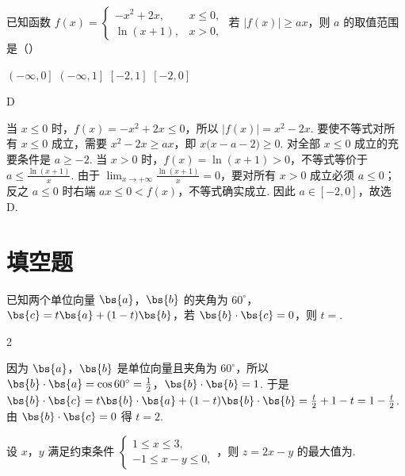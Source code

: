 \begin{problem}
已知函数 \(f(x) = \begin{cases}
-x^2 + 2x, & x \leqslant 0,\\
\ln (x + 1), & x > 0,
\end{cases} \) 若 \(|f(x)| \geqslant ax\)，则 \( a \) 的取值范围是（\quad）

\choices
    {\(\left(-\infty,0\right]\)}
    {\(\left(-\infty,1\right]\)}
    {\(\left[-2,1\right]\)}
    {\(\left[-2,0\right]\)}
\end{problem}

\begin{answer}
D
\end{answer}

\begin{solution}
当 \(x\leqslant0\) 时，\(f(x)=-x^2+2x\leqslant0\)，所以 \(|f(x)|=x^2-2x\). 要使不等式对所有 \(x\leqslant0\) 成立，需要
\(x^2-2x\geqslant ax\)，即 \(x\bigl(x-a-2\bigr)\geqslant0\). 对全部 \(x\leqslant0\) 成立的充要条件是 \(a\geqslant-2\). 当 \(x>0\) 时，\(f(x)=\ln(x+1)>0\)，不等式等价于 \(\displaystyle a\leqslant\frac{\ln(x+1)}{x}\). 由于 \(\displaystyle\lim_{x\to+\infty}\frac{\ln(x+1)}{x}=0\)，要对所有 \(x>0\) 成立必须 \(a\leqslant0\)；反之 \(a\leqslant0\) 时右端 \(ax\leqslant0<f(x)\)，不等式确实成立. 因此 \(a\in[-2,0]\)，故选 D.
\end{solution}

\section{填空题}

\begin{problem}
已知两个单位向量 \(\bs{a}\)，\(\bs{b}\) 的夹角为 \(60^{\circ}\)，\(\bs{c} = t\bs{a} + (1 - t)\bs{b}\)，若 \(\bs{b} \cdot \bs{c} = 0\)，则 \(t =\)\fillinblank{}.
\end{problem}

\begin{answer}
2
\end{answer}

\begin{solution}
因为 \(\bs{a}\)，\(\bs{b}\) 是单位向量且夹角为 \(60^\circ\)，所以 \(\bs{b}\cdot\bs{a}=\cos60^\circ=\frac{1}{2}\)，\(\bs{b}\cdot\bs{b}=1\). 于是
\(\bs{b}\cdot\bs{c}=t\bs{b}\cdot\bs{a}+(1-t)\bs{b}\cdot\bs{b}=\frac{t}{2}+1-t=1-\frac{t}{2}\). 由 \(\bs{b}\cdot\bs{c}=0\) 得 \(t=2\).
\end{solution}

\begin{problem}
设 \(x\)，\(y\) 满足约束条件 \(\begin{cases}
1 \leqslant x \leqslant 3,\\
-1 \leqslant x - y \leqslant 0,
\end{cases}\)，则 \(z = 2x - y\) 的最大值为\fillinblank{}.
\end{problem}

